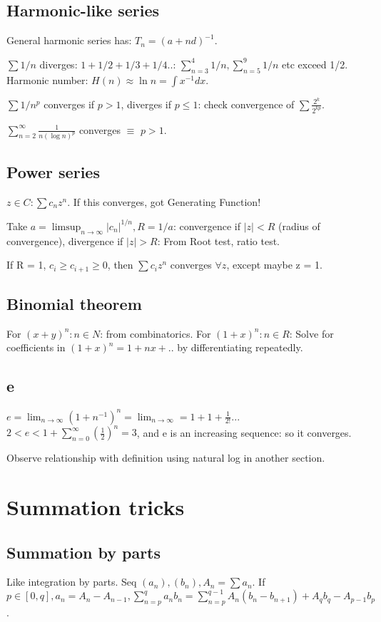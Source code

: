 \documentclass[oneside, article]{memoir}
\begin{document}
\subsection{Harmonic-like series}
General harmonic series has: $T_n = (a + nd)^{-1}$.

$\sum 1/n $ diverges: $1 + 1/2 + 1/3 + 1/4 ..$: $\sum_{n=3}^{4} 1/n,  \sum_{n=5}^{9} 1/n$ etc exceed 1/2. Harmonic number: $H(n)\approx \ln n = \int x^{-1} dx$.

$\sum 1/n^{p}$ converges if $p>1$, diverges if $p \leq 1$: check convergence of $\sum \frac{2^{k}}{2^{kp}}$.

$\sum_{n=2}^{\infty} \frac{1}{n (\log n)^{p}}$ converges $\equiv$ $p>1$.

\subsection{Power series}
$z\in C: \sum c_{n}z^{n}$. If this converges, got Generating Function!

Take $a = \limsup_{n \to \infty} |c_{n}|^{1/n}, R = 1/a$: convergence if $|z|<R$ (radius of convergence), divergence if $|z|>R$: From Root test, ratio test.

If R = 1, $c_{i} \geq c_{i+1} \geq 0$, then $\sum c_{i}z^{n}$ converges $\forall z$, except maybe z = 1. \why

\subsection{Binomial theorem}
For $(x+y)^{n} : n\in N$: from combinatorics. For $(1+x)^{n} : n\in R$: Solve for coefficients in $(1+x)^{n} = 1 + nx + .. $ by differentiating repeatedly.

\subsection{e}
$e = \lim_{n \to \infty} (1+n^{-1})^{n} = \lim_{n \to \infty} = 1 + 1 + \frac{1}{2!} .. $. $2 < e < 1 + \sum_{n=0}^{\infty} (\frac{1}{2})^{n} = 3$, and e is an increasing sequence: so it converges.

Observe relationship with definition using natural log in another section.

\section{Summation tricks}
\subsection{Summation by parts}
Like integration by parts. Seq $(a_{n}), (b_{n}),  A_{n} = \sum a_{n}$. If $p \in [0, q], a_{n} = A_{n} - A_{n-1}, \sum_{n=p}^{q} a_{n}b_{n} = \sum_{n=p}^{q-1} A_{n}(b_{n}-b_{n+1}) + A_{q}b_{q} - A_{p-1}b_{p}$.
\end{document}
